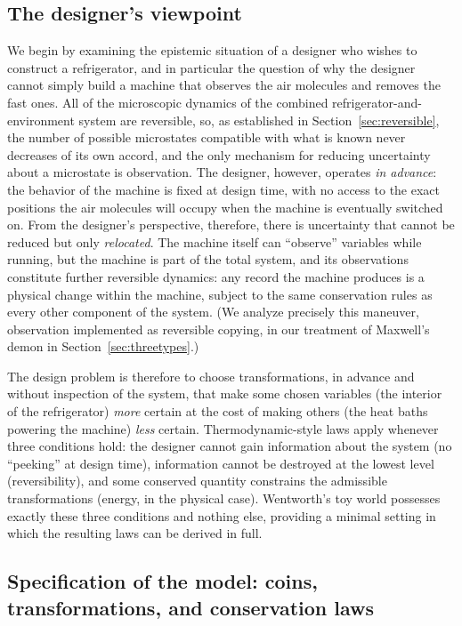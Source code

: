 \documentclass[10pt]{article}
\theoremstyle{definition}
\theoremstyle{remark}
\begin{document}
\subsection{The designer's viewpoint}
\label{sec:designer}

We begin by examining the epistemic situation of a designer who wishes to construct a refrigerator, and in particular the question of why the designer cannot simply build a machine that observes the air molecules and removes the fast ones. All of the microscopic dynamics of the combined refrigerator-and-environment system are reversible, so, as established in Section~\ref{sec:reversible}, the number of possible microstates compatible with what is known never decreases of its own accord, and the only mechanism for reducing uncertainty about a microstate is observation. The designer, however, operates \emph{in advance}: the behavior of the machine is fixed at design time, with no access to the exact positions the air molecules will occupy when the machine is eventually switched on. From the designer's perspective, therefore, there is uncertainty that cannot be reduced but only \emph{relocated}. The machine itself can ``observe'' variables while running, but the machine is part of the total system, and its observations constitute further reversible dynamics: any record the machine produces is a physical change within the machine, subject to the same conservation rules as every other component of the system. (We analyze precisely this maneuver, observation implemented as reversible copying, in our treatment of Maxwell's demon in Section~\ref{sec:threetypes}.)

The design problem is therefore to choose transformations, in advance and without inspection of the system, that make some chosen variables (the interior of the refrigerator) \emph{more} certain at the cost of making others (the heat baths powering the machine) \emph{less} certain. Thermodynamic-style laws apply whenever three conditions hold: the designer cannot gain information about the system (no ``peeking'' at design time), information cannot be destroyed at the lowest level (reversibility), and some conserved quantity constrains the admissible transformations (energy, in the physical case). Wentworth's toy world possesses exactly these three conditions and nothing else, providing a minimal setting in which the resulting laws can be derived in full.

\subsection{Specification of the model: coins, transformations, and conservation laws}
\label{sec:coinsetup}
\end{document}
